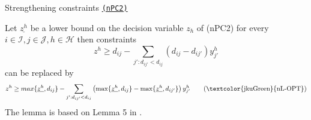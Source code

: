 \documentclass[utf8,aspectratio=1610,ngerman,english]{beamer}
\renewcommand{\emph}[1]{\textcolor{jkuGreen}{#1}}
\newcommand{\nPC}{\hyperref[eq:nPC]{\texttt{(nPC1)}}\xspace}
\newcommand{\nPCE}{\hyperref[eq:nPCE]{\texttt{(nPC3)}}\xspace}
\newcommand{\nPCY}{\hyperref[eq:nPCY]{\texttt{(nPC2)}}\xspace}
\begin{document}
\begin{frame}{Strengthening constraints \nPCY} \pause
    \vspace{-2pt}
    \begin{lemma}\label{theorem:strength}
        Let $\underline{z^h}$ be a lower bound on the decision variable $z_h$ of (nPC2) for every $i \in \mathcal I, j \in \mathcal J, h \in \mathcal H$ then constraints \pause
        \begin{equation*}
            z^{h} \geq d_{ij} - \sum_{j':d_{ij'} < d_{ij}}(d_{ij} - d_{ij'})y_{j'}^h
        \end{equation*}
        can be replaced by \pause
        \begin{equation}
            z^h \geq max\{\underline{z^h}, d_{ij}\} - \sum_{j':d_{ij'} < d_{ij}} \left(\max \{\underline{z^h}, d_{ij}\} - \max \{\underline{z^h}, d_{ij'}\}\right)y_{j'}^h  \label{eq:nPC2-lift} \tag{\emph{nL-OPT}}
        \end{equation}
        The lemma is based on Lemma 5 in \textcite{GAAR2022}.
    \end{lemma}
\end{frame}

\end{document}

